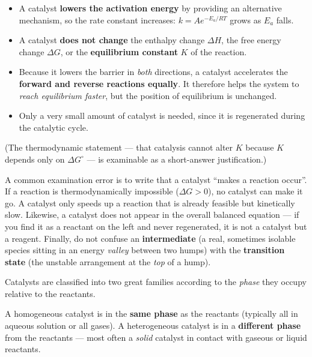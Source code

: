 \documentclass[11pt]{article}
\newcommand{\cle}[1]{{\popxbold\color{popdark}#1}}
\begin{document}
\begin{propriete}
\begin{itemize}
\item A catalyst \textbf{lowers the activation energy} by providing an alternative mechanism, so the rate constant increases: $k = A e^{-E_a/RT}$ grows as $E_a$ falls.
\item A catalyst \textbf{does not change} the enthalpy change $\Delta H$, the free energy change $\Delta G$, or the \textbf{equilibrium constant} $K$ of the reaction.
\item Because it lowers the barrier in \emph{both} directions, a catalyst accelerates the \textbf{forward and reverse reactions equally}. It therefore helps the system to \emph{reach equilibrium faster}, but the position of equilibrium is unchanged.
\item Only a very small amount of catalyst is needed, since it is regenerated during the catalytic cycle.
\end{itemize}
(The thermodynamic statement — that catalysis cannot alter $K$ because $K$ depends only on $\Delta G^{\circ}$ — is examinable as a short-answer justification.)
\end{propriete}

\begin{attention}
A common examination error is to write that a catalyst ``makes a reaction occur''. If a reaction is thermodynamically impossible ($\Delta G > 0$), no catalyst can make it go. A catalyst only speeds up a reaction that is already feasible but kinetically slow. Likewise, a catalyst does not appear in the overall balanced equation — if you find it as a reactant on the left and never regenerated, it is not a catalyst but a reagent. Finally, do not confuse an \textbf{intermediate} (a real, sometimes isolable species sitting in an energy \emph{valley} between two humps) with the \textbf{transition state} (the unstable arrangement at the \emph{top} of a hump).
\end{attention}

Catalysts are classified into two great families according to the \emph{phase} they occupy relative to the reactants.

\begin{definition}
A \cle{homogeneous catalyst} is in the \textbf{same phase} as the reactants (typically all in aqueous solution or all gases). A \cle{heterogeneous catalyst} is in a \textbf{different phase} from the reactants — most often a \emph{solid} catalyst in contact with gaseous or liquid reactants.
\end{definition}
\end{document}
